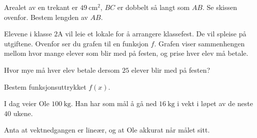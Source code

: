 Arealet av en trekant er $\SI{49}{\cm\squared}$, $BC$ er dobbelt så langt som
$AB$. Se skissen ovenfor. Bestem lengden av $AB$.

\Oppgave[2] %

\begin{figure}[H]
  \centering
  \caption{}
  \label{fig:del-1-oppgave-1-6}
\end{figure}

Elevene i klasse $2$A vil leie et lokale for å arrangere klassefest. De vil
spleise på utgiftene. Ovenfor ser du grafen til en funksjon $f$. Grafen viser
sammenhengen mellom hvor mange elever som blir med på festen, og prise hver elev
må betale.

\begin{oppgaver}
   Hvor mye må hver elev betale dersom $25$ elever blir med på festen?
\end{oppgaver}

\begin{oppgaver}
   Bestem funksjonsuttrykket $f(x)$.
\end{oppgaver}


\Oppgave[7] %

I dag veier Ole $\SI{100}{\kg}$. Han har som mål å gå ned $\SI{16}{\kg}$ i vekt
i løpet av de neste $40$ ukene. \bigskip

Anta at vektnedgangen er lineær, og at Ole akkurat når målet sitt.

